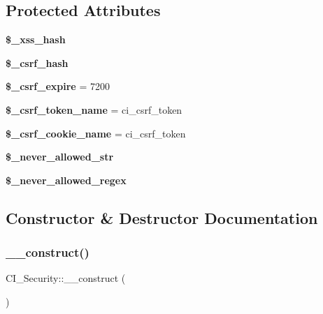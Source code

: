 \subsection*{Protected Attributes}
\begin{DoxyCompactItemize}
\item 
\mbox{\label{class_c_i___security_a3987b2ed5ea8df9f98eac07976c30ae8}} 
{\bfseries \$\+\_\+xss\+\_\+hash}
\item 
\mbox{\label{class_c_i___security_aec20ea912b1d7906a108056c1834e9ea}} 
{\bfseries \$\+\_\+csrf\+\_\+hash}
\item 
\mbox{\label{class_c_i___security_a08c3d144a0697310423cd668bc256a10}} 
{\bfseries \$\+\_\+csrf\+\_\+expire} = 7200
\item 
\mbox{\label{class_c_i___security_a7dcb10cc437d3ffd4fd42a1aef99b153}} 
{\bfseries \$\+\_\+csrf\+\_\+token\+\_\+name} = \textquotesingle{}ci\+\_\+csrf\+\_\+token\textquotesingle{}
\item 
\mbox{\label{class_c_i___security_af436bcece233da6228a6b97376b0f8c7}} 
{\bfseries \$\+\_\+csrf\+\_\+cookie\+\_\+name} = \textquotesingle{}ci\+\_\+csrf\+\_\+token\textquotesingle{}
\item 
{\bfseries \$\+\_\+never\+\_\+allowed\+\_\+str}
\item 
{\bfseries \$\+\_\+never\+\_\+allowed\+\_\+regex}
\end{DoxyCompactItemize}


\subsection{Constructor \& Destructor Documentation}
\mbox{\label{class_c_i___security_acd6d23d91f9d1694f2b452174453923a}} 
\subsubsection{\texorpdfstring{\+\_\+\+\_\+construct()}{\_\_construct()}}
{\footnotesize\ttfamily C\+I\+\_\+\+Security\+::\+\_\+\+\_\+construct (\begin{DoxyParamCaption}{ }\end{DoxyParamCaption})}

